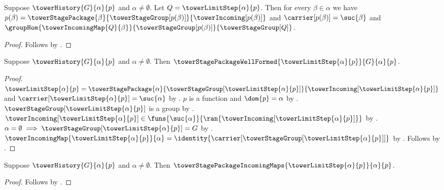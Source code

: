 \begin{proposition}\label{tower_limit_step_predecessor_laws}
    Suppose $\towerHistory{G}{\alpha}{p}$ and
        $\alpha\neq\emptyset$.
    Let $Q=\towerLimitStep{\alpha}{p}$.
    Then for every $\beta\in\alpha$ we have
        $p(\beta)=\towerStagePackage{\beta}
            {\towerStageGroup[p(\beta)]}{\towerIncoming[p(\beta)]}$ and
        $\carrier[p(\beta)]=\suc{\beta}$ and
        $\groupHom
            {\towerIncomingMap{Q}{\beta}}
            {\towerStageGroup[p(\beta)]}
            {\towerStageGroup[Q]}$.
\end{proposition}
\begin{proof}
    Follows by
        .
\end{proof}

\begin{proposition}\label{tower_limit_step_well_formed}
    Suppose $\towerHistory{G}{\alpha}{p}$ and
        $\alpha\neq\emptyset$.
    Then $\towerStagePackageWellFormed
        {\towerLimitStep{\alpha}{p}}{G}{\alpha}{p}$.
\end{proposition}
\begin{proof}
    $\towerLimitStep{\alpha}{p}=
        \towerStagePackage{\alpha}
            {\towerStageGroup[\towerLimitStep{\alpha}{p}]}
            {\towerIncoming[\towerLimitStep{\alpha}{p}]}$ and
        $\carrier[\towerLimitStep{\alpha}{p}]=\suc{\alpha}$ by
        .
    $p$ is a function and $\dom{p}=\alpha$ by
        .
    $\towerStageGroup[\towerLimitStep{\alpha}{p}]$ is a group by
        .
    $\towerIncoming[\towerLimitStep{\alpha}{p}]\in
        \funs{\suc{\alpha}}{
            \ran{\towerIncoming[\towerLimitStep{\alpha}{p}]}}$ by
        .
    $\alpha=\emptyset\implies
        \towerStageGroup[\towerLimitStep{\alpha}{p}]=G$ by
        .
    $\towerIncomingMap{\towerLimitStep{\alpha}{p}}{\alpha}=
        \identity{\carrier[
            \towerStageGroup[\towerLimitStep{\alpha}{p}]]}$ by
        .
    Follows by .
\end{proof}

\begin{proposition}\label{tower_limit_step_incoming_maps}
    Suppose $\towerHistory{G}{\alpha}{p}$ and
        $\alpha\neq\emptyset$.
    Then $\towerStagePackageIncomingMaps
        {\towerLimitStep{\alpha}{p}}{\alpha}{p}$.
\end{proposition}
\begin{proof}
    Follows by
        .
\end{proof}

